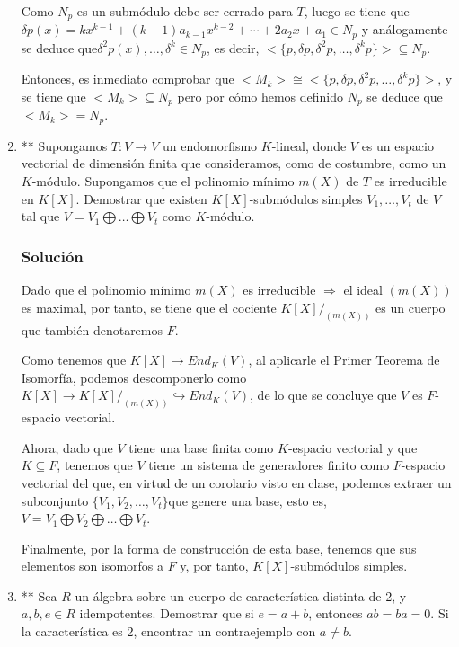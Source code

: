 \documentclass[paper=a4, fontsize=11pt, spanish]{scrartcl}
\begin{document}
\begin{enumerate}
		Como $N_p$ es un submódulo debe ser cerrado para $T$, luego se tiene
		que $\delta p(x) = kx^{k-1} + (k-1)a_{k-1}x^{k-2} + \cdots + 2a_2x+a_1 \in N_p$ y análogamente se deduce
		que$\delta^2 p(x), \dots, \delta^{k} \in N_p$, es decir, $<\{p, \delta p, \delta^2 p, \dots, \delta^k p\}>
		\subseteq N_p$.
		
		Entonces, es inmediato comprobar que $ <M_k> \cong <\{p, \delta p, \delta^2 p, \dots, \delta^k p\}>$, y
		se tiene que $<M_k> \subseteq N_p$ pero por cómo hemos definido $N_p$ se deduce que $<M_k> = N_p$.
		
		\item ** Supongamos $T: V \rightarrow V$ un endomorfismo $K$-lineal, donde $V$ es un espacio vectorial de
		dimensión finita que consideramos, como de costumbre, como un $K$-módulo. Supongamos que el polinomio
		mínimo $m(X)$ de $T$ es irreducible en $K[X]$. Demostrar que existen $K[X]$-submódulos simples $V_1, \dots,
		V_t$ de $V$ tal que $V = V_1 \bigoplus \dots \bigoplus V_t$ como $K$-módulo.
		\subsubsection*{Solución}
		Dado que el polinomio mínimo $m(X)$ es irreducible $\Rightarrow$ el ideal $(m(X))$ es maximal, por tanto,
		se tiene que el cociente $K[X]/_{(m(X))}$ es un cuerpo que también denotaremos $F$.
		
		Como tenemos que $K[X] \rightarrow End_K(V)$, al aplicarle el Primer Teorema de Isomorfía, podemos
		descomponerlo como $K[X] \rightarrow K[X]/_{(m(X))} \hookrightarrow End_K(V)$, de lo que se concluye que
		$V$ es $F$-espacio vectorial.
		
		Ahora, dado que $V$ tiene una base finita como $K$-espacio vectorial y que $K \subseteq F$, tenemos que
		$V$ tiene un sistema de generadores finito como $F$-espacio vectorial del que, en virtud de un corolario
		visto en clase, podemos extraer un subconjunto $\{V_1, V_2, \dots, V_t\}$que genere una base, esto es,
		$V = V_1 \bigoplus V_2 \bigoplus \dots \bigoplus V_t$.
		
		Finalmente, por la forma de construcción de esta base, tenemos que sus elementos son isomorfos a $F$ y,
		por tanto, $K[X]$-submódulos simples.
		
		\item ** Sea $R$ un álgebra sobre un cuerpo de característica distinta de 2, y $a, b, e \in R$ idempotentes.
		Demostrar que si $e = a + b$, entonces $ab = ba = 0$. Si la característica es 2, encontrar un contraejemplo
		con $a \neq b$.

\end{enumerate}
\end{document}
